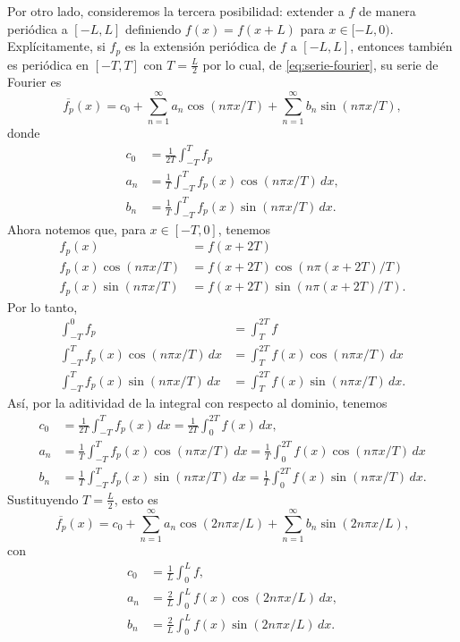 \documentclass[11pt,letterpaper,draft]{report}
\newcommand\<{\langle}
\renewcommand\>{\rangle}
\begin{document}
Por otro lado, consideremos la tercera posibilidad: extender a $f$ de
manera periódica a $[-L,L]$ definiendo $f(x)=f(x+L)$ para
$x\in[-L,0)$.
Explícitamente, si $f_p$ es la extensión periódica de $f$ a $[-L,L]$,
entonces también es periódica en $[-T,T]$ con $T=\frac{L}{2}$
por lo cual, de \eqref{eq:serie-fourier}, su serie de Fourier es
\[
  \overline{f_p}(x) = c_0
  + \sum_{n=1}^\infty a_n\cos(n\pi x/T)
  + \sum_{n=1}^\infty b_n\sin(n\pi x/T)
,
\]
donde
\begin{align*}
  c_0 &= \frac{1}{2T}\int_{-T}^T f_p \\
  a_n &= \frac{1}{T}\int_{-T}^T f_p(x)\cos(n\pi x/T)\,dx, \\
  b_n &= \frac{1}{T}\int_{-T}^T f_p(x)\sin(n\pi x/T)\,dx.
\end{align*}
Ahora notemos que, para $x\in[-T,0]$, tenemos
\begin{align*}
  f_p(x) &=f(x+2T) \\
  f_p(x)\cos(n\pi x/T) &=f(x+2T)\cos(n\pi(x+2T)/T) \\
  f_p(x)\sin(n\pi x/T) &=f(x+2T)\sin(n\pi(x+2T)/T).
\end{align*}
Por lo tanto,
\begin{align*}
  \int_{-T}^{0}f_p
    &=\int_{T}^{2T}f \\
  \int_{-T}^{T}f_p(x)\cos(n\pi x/T)\,dx
    &=\int_{T}^{2T}f(x)\cos(n\pi x/T)\,dx \\
  \int_{-T}^{T}f_p(x)\sin(n\pi x/T)\,dx
    &=\int_{T}^{2T}f(x)\sin(n\pi x/T)\,dx.
\end{align*}
Así, por la aditividad de la integral con respecto al dominio, tenemos
\begin{align*}
  c_0
  &= \frac{1}{2T}\int_{-T}^T f_p(x)\,dx
  = \frac{1}{2T}\int_{0}^{2T} f(x)\,dx, \\
  a_n
  &= \frac{1}{T}\int_{-T}^T f_p(x)\cos(n\pi x/T)\,dx
  = \frac{1}{T}\int_{0}^{2T} f(x)\cos(n\pi x/T)\,dx \\
  b_n
  &= \frac{1}{T}\int_{-T}^T f_p(x)\sin(n\pi x/T)\,dx
  = \frac{1}{T}\int_{0}^{2T} f(x)\sin(n\pi x/T)\,dx.
\end{align*}
Sustituyendo $T=\frac{L}{2}$, esto es
\begin{equation}
  \overline{f_p}(x) = c_0
  + \sum_{n=1}^\infty a_n\cos(2n\pi x/L)
  + \sum_{n=1}^\infty b_n\sin(2n\pi x/L)
,
\end{equation}
con
\begin{align*}
  c_0
  &= \frac{1}{L}\int_{0}^{L} f, \\
  a_n
  &= \frac{2}{L}\int_{0}^{L} f(x)\cos(2n\pi x/L)\,dx, \\
  b_n
  &= \frac{2}{L}\int_{0}^{L} f(x)\sin(2n\pi x/L)\,dx.
\end{align*}
\end{document}
